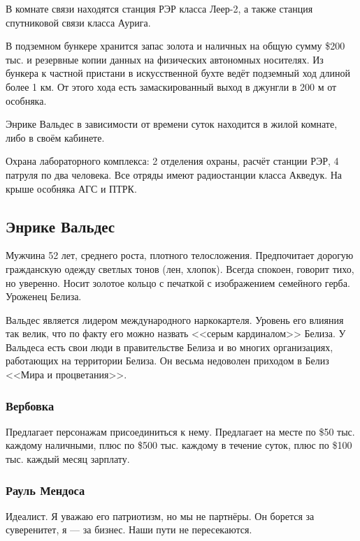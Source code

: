 \documentclass{article}
\begin{document}
В комнате связи находятся станция РЭР класса Леер-2, а также станция
спутниковой связи класса Аурига.

В подземном бункере хранится запас золота и наличных на общую сумму
\$200 тыс. и резервные копии данных на физических автономных носителях.
Из бункера к частной пристани в искусственной бухте ведёт подземный ход
длиной более 1 км. От этого хода есть замаскированный выход в джунгли в
200 м от особняка.

Энрике Вальдес в зависимости от времени суток находится в жилой комнате,
либо в своём кабинете.

Охрана лабораторного комплекса: 2 отделения охраны, расчёт станции РЭР,
4 патруля по два человека. Все отряды имеют радиостанции класса Акведук.
На крыше особняка АГС и ПТРК.

\subsection{Энрике
Вальдес}\label{enrique-valdes-char}

Мужчина 52 лет, среднего роста, плотного телосложения. Предпочитает
дорогую гражданскую одежду светлых тонов (лен, хлопок). Всегда спокоен,
говорит тихо, но уверенно. Носит золотое кольцо с печаткой с
изображением семейного герба. Уроженец Белиза.

Вальдес является лидером международного наркокартеля. Уровень его
влияния так велик, что по факту его можно назвать <<серым кардиналом>>
Белиза. У Вальдеса есть свои люди в правительстве Белиза и во многих
организациях, работающих на территории Белиза. Он весьма недоволен
приходом в Белиз <<Мира и процветания>>.

\subsubsection{Вербовка}\label{recruitment-valdes}

Предлагает персонажам присоединиться к нему. Предлагает на месте по \$50
тыс. каждому наличными, плюс по \$500 тыс. каждому в течение суток, плюс
по \$100 тыс. каждый месяц зарплату.

\subsubsection{Рауль
Мендоса}\label{raul-mendoza-valdes}

Идеалист. Я уважаю его патриотизм, но мы не партнёры. Он борется за
суверенитет, я --- за бизнес. Наши пути не пересекаются.
\end{document}

